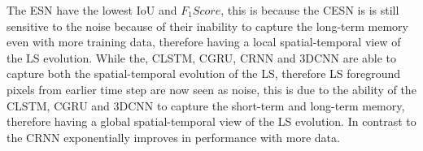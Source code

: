 \documentclass{WitsPhysicsReport}
\begin{document}
The ESN have the lowest IoU and $F_{1}Score$, this is because the CESN is is still sensitive to the noise because of their inability to capture the long-term memory even with more training data, therefore having a local spatial-temporal view of the LS evolution. While the, CLSTM, CGRU, CRNN and 3DCNN are able to capture both the spatial-temporal evolution of the LS, therefore LS foreground pixels from earlier time step are now seen as noise, this is due to the ability of the CLSTM, CGRU and 3DCNN to capture the short-term and long-term memory, therefore having a global spatial-temporal view of the LS evolution. In contrast to the CRNN exponentially improves in performance with more data.






\end{document}

